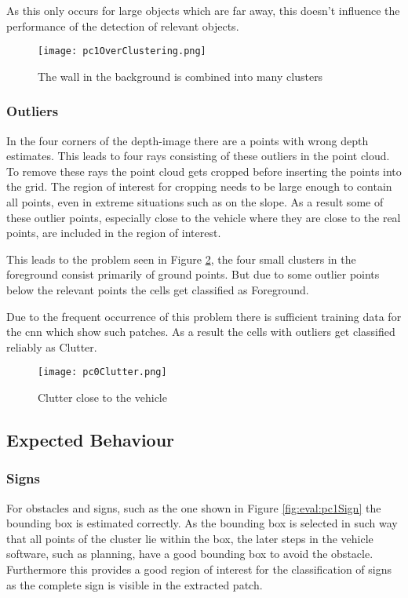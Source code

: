As this only occurs for large objects which are far away, this doesn't influence the performance of the detection of relevant objects.
\begin{figure}[h!]
    \centering
    \texttt{[image: pc1OverClustering.png]}
    \caption{The wall in the background is combined into many clusters}
    \label{fig:eval:pc1OverClustering}
\end{figure}

\subsubsection{Outliers} \label{sec:eval:outlier}
In the four corners of the depth-image there are a points with wrong depth estimates.
This leads to four rays consisting of these outliers in the point cloud. 
To remove these rays the point cloud gets cropped before inserting the points into the grid. 
The region of interest for cropping needs to be large enough to contain all points, even in extreme situations such as on the slope.
As a result some of these outlier points, especially close to the vehicle where they are close to the real points, are included in the region of interest.

This leads to the problem seen in Figure \ref{fig:eval:pc0Clutter}, the four small clusters in the foreground consist primarily of ground points.
But due to some outlier points below the relevant points the cells get classified as Foreground.

Due to the frequent occurrence of this problem there is sufficient training data for the \ac{cnn} which show such patches. As a result the cells with outliers get classified reliably as Clutter.
\begin{figure}[h!]
    \centering
    \texttt{[image: pc0Clutter.png]}
    \caption{Clutter close to the vehicle}
    \label{fig:eval:pc0Clutter}
\end{figure}

\subsection{Expected Behaviour}
\subsubsection{Signs}
For obstacles and signs, such as the one shown in Figure \ref{fig:eval:pc1Sign} the bounding box is estimated correctly. 
As the bounding box is selected in such way that all points of the cluster lie within the box,
the later steps in the vehicle software, such as planning, have a good bounding box to avoid the obstacle.
Furthermore this provides a good region of interest for the classification of signs as the complete sign is visible in the extracted patch.

